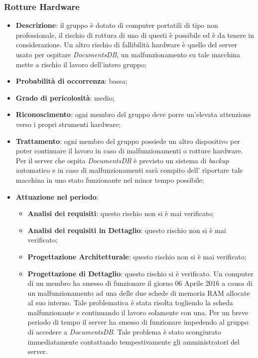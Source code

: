 		\subsubsection{Rotture Hardware}
		\begin{itemize}
			\item \textbf{Descrizione}: il gruppo è dotato di computer portatili di tipo non professionale, il rischio di rottura di uno di questi è possibile ed è da tenere in considerazione. Un altro rischio di fallibilità hardware è quello del server usato per ospitare \textit{DocumentsDB}, un malfunzionamento su tale macchina mette a rischio il lavoro dell'intero gruppo;
			\item \textbf{Probabilità di occorrenza}: bassa;
			\item \textbf{Grado di pericolosità}: medio;
			\item \textbf{Riconoscimento}: ogni membro del gruppo deve porre un'elevata attenzione verso i propri strumenti hardware;	
			\item \textbf{Trattamento}: ogni membro del gruppo possiede un altro dispositivo per poter continuare il lavoro in caso di malfunzionamenti o rotture hardware. Per il server che ospita \textit{DocumentsDB} è previsto un sistema di \textit{backup} automatico e in caso di malfunzionamenti sarà compito dell'\textit{\Amm} riportare tale macchina in uno stato funzionante nel minor tempo possibile;
			\item \textbf{Attuazione nel periodo}:
			\begin{itemize}
				\item \textbf{Analisi dei requisiti}: questo rischio non si è mai verificato;
				\item \textbf{Analisi dei requisiti in Dettaglio}: questo rischio non si è mai verificato;
				\item \textbf{Progettazione Architetturale}: questo rischio non si è mai verificato;
				\item \textbf{Progettazione di Dettaglio}: questo rischio si è verificato. Un computer di un membro ha smesso di funzionare il giorno 06 Aprile 2016 a causa di un malfunzionamento ad una delle due schede di memoria RAM allocate al suo interno. Tale problematica è stata risolta togliendo la scheda malfunzionante e continuando il lavoro solamente con una. Per un breve periodo di tempo il server ha smesso di funzionare impedendo al gruppo di accedere a \textit{DocumentsDB}. Tale problema è stato scongiurato immediatamente contattando tempestivamente gli amministratori del server. 

\end{itemize}
\end{itemize}
